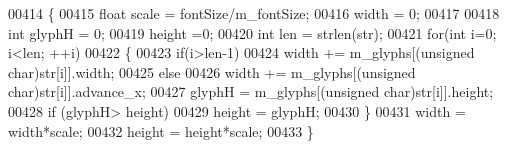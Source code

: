 \begin{DoxyCode}
00414 \{
00415     \textcolor{keywordtype}{float} scale = fontSize/m_fontSize;
00416     width = 0;
00417 
00418     \textcolor{keywordtype}{int} glyphH = 0;
00419     height =0;
00420     \textcolor{keywordtype}{int} len = strlen(str);
00421     \textcolor{keywordflow}{for}(\textcolor{keywordtype}{int} i=0; i<len; ++i)
00422     \{
00423         \textcolor{keywordflow}{if}(i>len-1)
00424             width += m_glyphs[(\textcolor{keywordtype}{unsigned} char)str[i]].width;
00425         \textcolor{keywordflow}{else}
00426             width += m_glyphs[(\textcolor{keywordtype}{unsigned} char)str[i]].advance\_x;
00427         glyphH = m_glyphs[(\textcolor{keywordtype}{unsigned} char)str[i]].height;
00428         \textcolor{keywordflow}{if} (glyphH> height)
00429             height = glyphH;
00430     \}
00431     width = width*scale;
00432     height = height*scale;
00433 \}
\end{DoxyCode}

